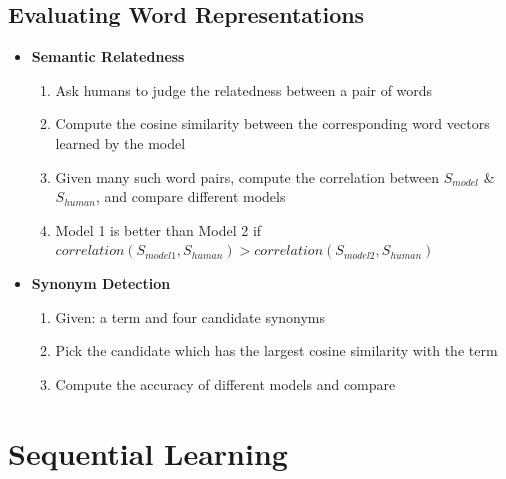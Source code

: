 \documentclass[a4paper]{article}
\begin{document}
\subsection{Evaluating Word Representations}
\begin{itemize}
    \item \textbf{Semantic Relatedness}
    \begin{enumerate}
        \item Ask humans to judge the relatedness between a pair of words
        \item Compute the cosine similarity between the corresponding word vectors learned by the model
        \item Given many such word pairs, compute the correlation between $S_{model}$ \& $S_{human}$, and compare different models
        \item Model 1 is better than Model 2 if $correlation(S_{model1}, S_{human}) > correlation(S_{model2}, S_{human})$
    \end{enumerate}
    \item \textbf{Synonym Detection}
    \begin{enumerate}
        \item Given: a term and four candidate synonyms
        \item Pick the candidate which has the largest cosine similarity with the term
        \item Compute the accuracy of different models and compare
    \end{enumerate}
\end{itemize}

\section{Sequential Learning}
\end{document}
